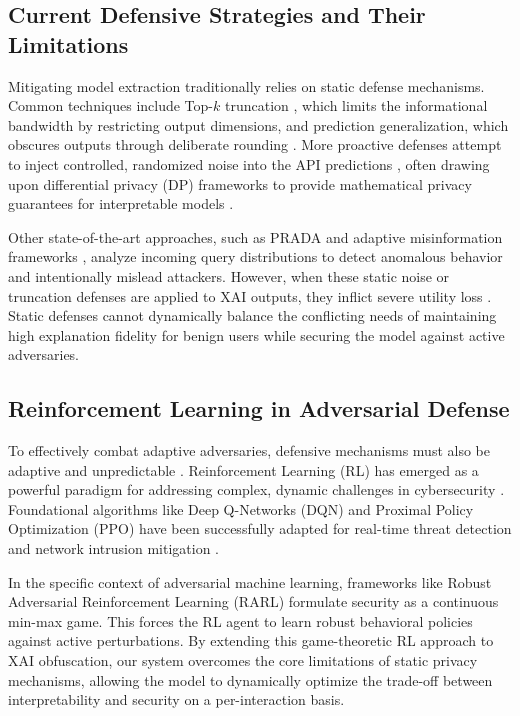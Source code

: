 \documentclass[conference]{IEEEtran}
\begin{document}
\subsection{Current Defensive Strategies and Their Limitations}
Mitigating model extraction traditionally relies on static defense mechanisms. Common techniques include Top-$k$ truncation \cite{b2}, which limits the informational bandwidth by restricting output dimensions, and prediction generalization, which obscures outputs through deliberate rounding \cite{b3}. More proactive defenses attempt to inject controlled, randomized noise into the API predictions \cite{b4, b20}, often drawing upon differential privacy (DP) frameworks \cite{b21} to provide mathematical privacy guarantees for interpretable models \cite{b22}. 

Other state-of-the-art approaches, such as PRADA \cite{b17} and adaptive misinformation frameworks \cite{b18, b19}, analyze incoming query distributions to detect anomalous behavior and intentionally mislead attackers. However, when these static noise or truncation defenses are applied to XAI outputs, they inflict severe utility loss \cite{b4}. Static defenses cannot dynamically balance the conflicting needs of maintaining high explanation fidelity for benign users while securing the model against active adversaries.

\subsection{Reinforcement Learning in Adversarial Defense}
To effectively combat adaptive adversaries, defensive mechanisms must also be adaptive and unpredictable \cite{b28}. Reinforcement Learning (RL) has emerged as a powerful paradigm for addressing complex, dynamic challenges in cybersecurity \cite{b25}. Foundational algorithms like Deep Q-Networks (DQN) \cite{b24} and Proximal Policy Optimization (PPO) \cite{b23} have been successfully adapted for real-time threat detection and network intrusion mitigation \cite{b26}. 

In the specific context of adversarial machine learning, frameworks like Robust Adversarial Reinforcement Learning (RARL) \cite{b27} formulate security as a continuous min-max game. This forces the RL agent to learn robust behavioral policies against active perturbations. By extending this game-theoretic RL approach to XAI obfuscation, our system overcomes the core limitations of static privacy mechanisms, allowing the model to dynamically optimize the trade-off between interpretability and security on a per-interaction basis.
\end{document}
